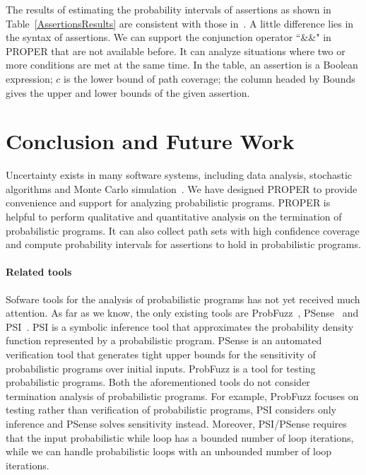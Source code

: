 \documentclass[runningheads]{llncs}
\begin{document}
The results of estimating the probability intervals of assertions as shown in Table~\ref{AssertionsResults} are consistent with those in~\cite{Sankaranarayanan2013Static}. A little difference lies in the syntax of assertions. We can support the conjunction operator  ``\&\&" in PROPER that are not available before. It can analyze situations where two or more conditions are met at the same time. In the table, an assertion is a Boolean expression; $c$ is the lower bound of path coverage; the column headed by Bounds gives the upper and lower bounds of the given assertion.


\section{Conclusion and Future Work}
Uncertainty exists in many software systems, including data analysis, stochastic algorithms and Monte Carlo simulation~\cite{HASTINGS1970Monte}. We have designed PROPER  to provide convenience and support for analyzing probabilistic programs.
PROPER is helpful to perform qualitative and quantitative analysis on the termination of probabilistic programs. It can also collect path sets with high confidence coverage and compute  probability intervals for assertions to hold in probabilistic programs.

\paragraph{Related tools}
Sofware tools for the analysis of probabilistic programs has not yet received much attention. 
As far as we know, the only existing tools are ProbFuzz~\cite{DBLP:conf/sigsoft/DuttaLHM18}, PSense~\cite{DBLP:conf/atva/HuangWM18} and PSI~\cite{DBLP:conf/cav/GehrMV16}.
PSI is a symbolic inference tool that approximates the probability density function represented by a probabilistic program. 
PSense is an automated verification tool that generates tight upper bounds for the sensitivity of probabilistic programs over initial inputs.
ProbFuzz is a tool for testing probabilistic programs. 
Both the aforementioned tools do not consider termination analysis of probabilistic programs. 
For example, ProbFuzz focuses on testing rather than verification of probabilistic programs, 
PSI considers only inference and PSense solves sensitivity instead. 
Moreover, PSI/PSense requires that the input probabilistic while loop has a bounded number of loop iterations, while we can handle probabilistic loops with an unbounded number of loop iterations.
\end{document}
